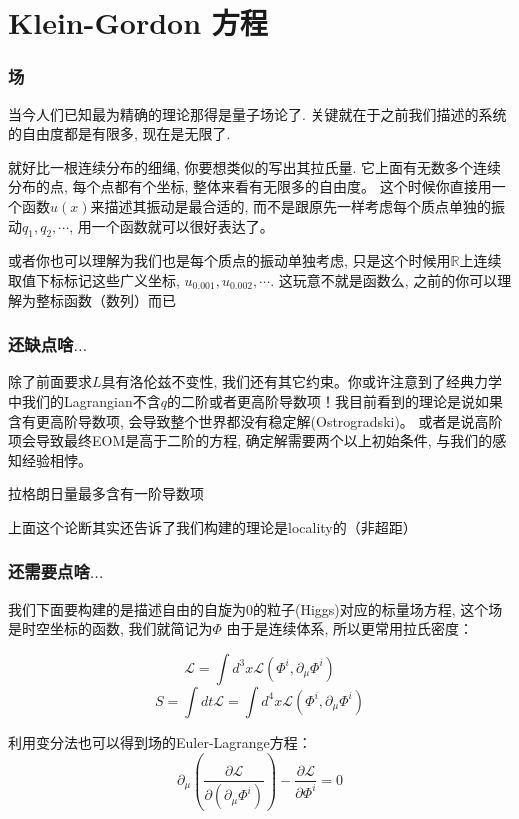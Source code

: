 \documentclass{whu-beamer}
\begin{document}
\section{Klein-Gordon 方程}
\begin{frame}
  \frametitle{场}
  当今人们已知最为精确的理论那得是量子场论了. 关键就在于之前我们描述的系统的自由度都是有限多, 现在是无限了.
  \pause

  \setlength{\parindent}{2em}就好比一根连续分布的细绳, 你要想类似的写出其拉氏量. 它上面有无数多个连续分布的点, 每个点都有个坐标, 整体来看有无限多的自由度。
  这个时候你直接用一个函数$u(x)$来描述其振动是最合适的, 而不是跟原先一样考虑每个质点单独的振动$q_1,q_2,\cdots$, 用一个函数就可以很好表达了。
  \pause

  \setlength{\parindent}{2em}或者你也可以理解为我们也是每个质点的振动单独考虑, 只是这个时候用$\mathbb{R}$上连续取值下标标记这些广义坐标, $u_{0.001},u_{0.002},\cdots$.
  这玩意不就是函数么, 之前的你可以理解为整标函数（数列）而已
\end{frame}

\begin{frame}
  \frametitle{还缺点啥$\ldots$}
  除了前面要求$L$具有洛伦兹不变性, 我们还有其它约束。你或许注意到了经典力学中我们的Lagrangian不含$q$的二阶或者更高阶导数项！我目前看到的理论是说如果含有更高阶导数项, 会导致整个世界都没有稳定解(Ostrogradski)。
  或者是说高阶项会导致最终EOM是高于二阶的方程, 确定解需要两个以上初始条件, 与我们的感知经验相悖。
  \pause
  \begin{theorem}
     拉格朗日量最多含有一阶导数项
  \end{theorem}
  上面这个论断其实还告诉了我们构建的理论是locality的（非超距）
\end{frame}

\begin{frame}
  \frametitle{还需要点啥$\ldots$}
  我们下面要构建的是描述自由的自旋为0的粒子(Higgs)对应的标量场方程, 这个场是时空坐标的函数, 我们就简记为$\Phi$
  \pause
  由于是连续体系, 所以更常用拉氏密度：
  \begin{definition}
    \begin{equation}
       \mathcal{L}=\int d^3 x \mathscr{L}(\Phi^i,\partial_\mu\Phi^i)
    \end{equation}
    \begin{equation}
      S=\int dt\mathcal{L}=\int d^4x\mathscr{L}(\Phi^i,\partial_\mu\Phi^i)
    \end{equation}
  \end{definition}
  \pause
  利用变分法也可以得到场的Euler-Lagrange方程：
  \alert{
    \begin{equation}
      \label{eq:9}
      \partial_\mu\left(\frac{\partial\mathscr{L}}{\partial(\partial_\mu \Phi^i)}\right)-\frac{\partial\mathscr{L}}{\partial \Phi^i}=0
  \end{equation}
  }
\end{frame}
\end{document}
